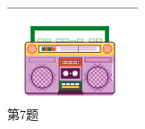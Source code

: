 \documentclass[10pt, a4paper]{article}
\begin{document}
\begin{enumerate}
        \begin{figure}[htbp]
            \centering
            \begin{minipage}[t]{.18\textwidth}
                \centering
                \includegraphics[width=\textwidth]{7.png}
                \caption*{第7题}
            \end{minipage}
            \begin{minipage}[t]{.07\textwidth}
                \centering

\end{minipage}
\end{figure}
\end{enumerate}
\end{document}
